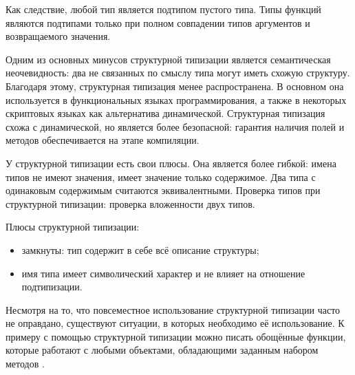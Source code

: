 Как следствие, любой тип является подтипом пустого типа. Типы функций являются подтипами только при полном совпадении типов аргументов и возвращаемого значения.

Одним из основных минусов структурной типизации является семантическая неочевидность: два не связанных по смыслу типа могут иметь схожую структуру. Благодаря этому, структурная типизация менее распространена. В основном она используется в функциональных языках программирования, а также в некоторых скриптовых языках как альтернатива динамической. Структурная типизация схожа с динамической, но является более безопасной: гарантия наличия полей и методов обеспечивается на этапе компиляции.

У структурной типизации есть свои плюсы. Она является более гибкой: имена типов не имеют значения, имеет значение только содержимое. Два типа с одинаковым содержимым считаются эквивалентными. Проверка типов при структурной типизации: проверка вложенности двух типов.

Плюсы структурной типизации:
\begin{itemize}
    \item замкнуты: тип содержит в себе всё описание структуры;
    \item имя типа имеет символический характер и не влияет на отношение подтипизации.
\end{itemize}

Несмотря на то, что повсеместное использование структурной типизации часто не оправдано, существуют ситуации, в которых необходимо её использование. К примеру с помощью структурной типизации можно писать обощённые функции, которые работают с любыми объектами, обладающими заданным набором методов \cite{JOT:issue_2008_01/article4}.
